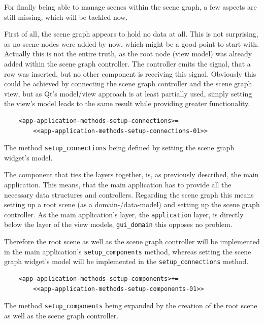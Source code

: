 \documentclass[10pt, openright, notitlepage]{scrreprt}
\begin{document}
For finally being able to manage scenes within the scene graph, a few aspects
are still missing, which will be tackled now.

First of all, the scene graph appears to hold no data at all. This is not
surprising, as no scene nodes were added by now, which might be a good point to
start with. Actually this is not the entire truth, as the root node (view model)
was already added within the scene graph controller. The controller emits the
signal, that a row was inserted, but no other component is receiving this
signal. Obviously this could be achieved by connecting the scene graph
controller and the scene graph view, but as Qt's model/view approach is at least
partially used, simply setting the view's model leads to the same result while
providing greater functionality.

\begin{listing}[H]
\begin{verbatim}
    <app-application-methods-setup-connections>=
        <<app-application-methods-setup-connections-01>>
\end{verbatim}
\caption{\label{lst:app-application-methods-setup-connections-01}
The method \texttt{setup\_connections} being defined by setting the scene graph widget's model.}
\end{listing}

The component that ties the layers together, is, as previously described, the
main application. This means, that the main application has to provide all the
necessary data structures and controllers. Regarding the scene graph this means
setting up a root scene (as a domain-/data-model) and setting up the scene graph
controller. As the main application's layer, the \texttt{application} layer,
is directly below the layer of the view models, \texttt{gui\_domain} this
opposes no problem.

Therefore the root scene as well as the scene graph controller will be
implemented in the main application's \texttt{setup\_components} method,
whereas setting the scene graph widget's model will be implemented in the
\texttt{setup\_connections} method.

\begin{listing}[H]
\begin{verbatim}
    <app-application-methods-setup-components>+=
        <<app-application-methods-setup-components-01>>
\end{verbatim}
\caption{The method \texttt{setup\_components} being expanded by the creation of the root scene as well as the scene graph controller.}
\end{listing}
\end{document}
